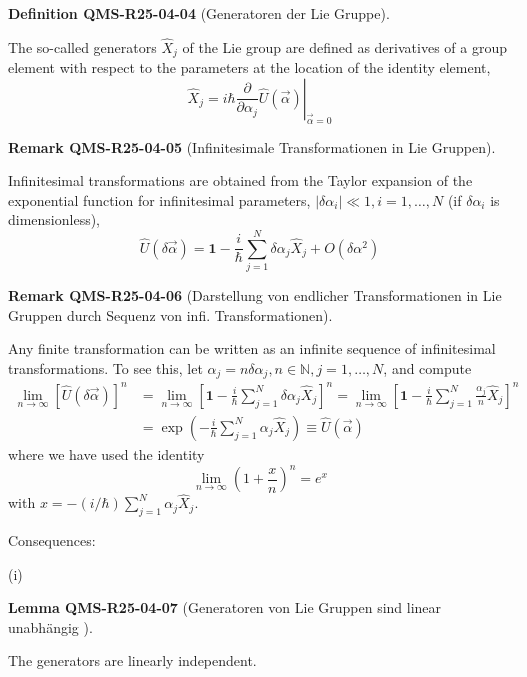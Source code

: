 \documentclass[10pt, letterpaper]{article}
\newcommand{\CustomHeading}[3]{%
  \par\medskip\noindent%
  \textbf{#1 #2} \textnormal{(#3)}.\enskip%
}
\newenvironment{DEF}[2]{\begin{unitbox}\CustomHeading{Definition}{#1}{#2}}{\end{unitbox}}
\newenvironment{LEM}[2]{\begin{unitbox}\CustomHeading{Lemma}{#1}{#2}}{\end{unitbox}}
\newenvironment{REM}[2]{\begin{unitbox}\CustomHeading{Remark}{#1}{#2}}{\end{unitbox}}
\begin{document}
\begin{DEF}{QMS-R25-04-04}{Generatoren der Lie Gruppe}
The so-called generators $\hat{X}_{j}$ of the Lie group are defined as derivatives of a group element with respect to the parameters at the location of the identity element,
$$
\hat{X}_{j}=\left.i \hbar \frac{\partial}{\partial \alpha_{j}} \hat{U}(\vec{\alpha})\right|_{\vec{\alpha}=0}
$$
\end{DEF}

\begin{REM}{QMS-R25-04-05}{Infinitesimale Transformationen in Lie Gruppen}
Infinitesimal transformations are obtained from the Taylor expansion of the exponential function for infinitesimal parameters, $\left|\delta \alpha_{i}\right| \ll 1, i=1, \ldots, N$ (if $\delta \alpha_{i}$ is dimensionless),
$$
\hat{U}(\delta \vec{\alpha})=\mathbf{1}-\frac{i}{\hbar} \sum_{j=1}^{N} \delta \alpha_{j} \hat{X}_{j}+O\left(\delta \alpha^{2}\right)
$$
\end{REM}


\begin{REM}{QMS-R25-04-06}{Darstellung von endlicher Transformationen in Lie Gruppen durch Sequenz von infi. Transformationen}
Any finite transformation can be written as an infinite sequence of infinitesimal transformations. To see this, let $\alpha_{j}=n \delta \alpha_{j}, n \in \mathbb{N}, j=1, \ldots, N$, and compute
$$
\begin{aligned}
\lim _{n \rightarrow \infty}[\hat{U}(\delta \vec{\alpha})]^{n} & =\lim _{n \rightarrow \infty}\left[\mathbf{1}-\frac{i}{\hbar} \sum_{j=1}^{N} \delta \alpha_{j} \hat{X}_{j}\right]^{n}=\lim _{n \rightarrow \infty}\left[\mathbf{1}-\frac{i}{\hbar} \sum_{j=1}^{N} \frac{\alpha_{j}}{n} \hat{X}_{j}\right]^{n} \\
& =\exp \left(-\frac{i}{\hbar} \sum_{j=1}^{N} \alpha_{j} \hat{X}_{j}\right) \equiv \hat{U}(\vec{\alpha})
\end{aligned}
$$
where we have used the identity
$$
\lim _{n \rightarrow \infty}\left(1+\frac{x}{n}\right)^{n}=e^{x}
$$
with $x=-(i / \hbar) \sum_{j=1}^{N} \alpha_{j} \hat{X}_{j}$.
\end{REM}




Consequences:


(i) 

\begin{LEM}{QMS-R25-04-07}{Generatoren von Lie Gruppen sind linear unabhängig }
The generators are linearly independent.
\end{LEM}
\end{document}
